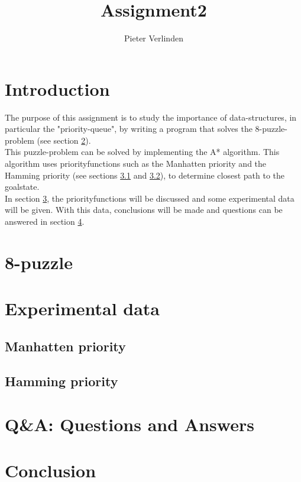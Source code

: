 \documentclass[12pt,a4paper,oneside]{article}
\author{Pieter Verlinden}
\title{Assignment2}
\begin{document}

\tableofcontents
\newpage
\section{Introduction}
The purpose of this assignment is to study the importance of data-structures, in particular the "priority-queue", by writing a program that solves the 8-puzzle-problem (see section \ref{sec:8puz}). 
\\

This puzzle-problem can be solved by implementing the A* algorithm\cite{A*Wiki}. This algorithm uses priorityfunctions such as the Manhatten priority and the Hamming priority (see sections \ref{subsec:ManPrior} and \ref{subsec:HamPrior}), to determine closest path to the goalstate.
\\

In section \ref{sec:expData}, the priorityfunctions will be discussed and some experimental data will be given. With this data, conclusions will be made and questions can be answered in section \ref{sec:QnA}.
\section{8-puzzle}\label{sec:8puz}
\section{Experimental data}\label{sec:expData}
\subsection{Manhatten priority}\label{subsec:ManPrior}
\subsection{Hamming priority}\label{subsec:HamPrior}
\section{Q{\&}A: Questions and Answers}\label{sec:QnA}
	\cite{princetonPuzzle}
\section{Conclusion}
\newpage


\end{document}

